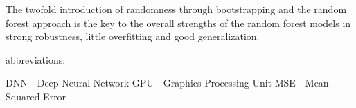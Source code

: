 The twofold introduction of randomness through bootstrapping and the random forest approach is the key to the overall strengths of the random forest models in strong robustness, little overfitting and good generalization.









abbreviations:

DNN - Deep Neural Network
GPU - Graphics Processing Unit
MSE - Mean Squared Error



